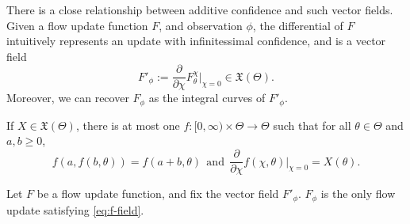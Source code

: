 There is a close relationship between additive confidence and such vector fields.
Given a flow update function $F$, and observation $\phi$, the
differential of $F$
intuitively represents an update with infinitessimal confidence, 
and is a vector field
\begin{equation}
	F'_\phi 
	:= \frac{\partial}{\partial \chi} F_{\theta}^{\chi} \Big|_{\chi=0}
	\in  \mathfrak X(\Theta).
	\label{eq:f-field}
\end{equation}
Moreover, we can recover $F_\phi$ as the integral curves of $F'_\phi$.

\begin{fact}
	If $X \in \mathfrak X(\Theta)$, 
	there is at most one
	$f : [0,\infty) \times \Theta \to \Theta$
	such that for all $\theta \in \Theta$ and $a,b\ge 0$,
	\[
	f(a, f(b, \theta)) = f(a+b,\theta)
		~~\text{and}~~
	\frac{\partial}{\partial \chi}
	 	f(\chi,\theta)
		\Big|_{\chi{=}0}
		\!\!= X(\theta)
		.
	\]
	\label{fact:unique-integral-curves}
\end{fact}
\begin{coro}
	Let $F$ be a flow update function, and fix the vector field $F'_{\phi}$.
	$F_\phi$ is the only flow update satisfying \eqref{eq:f-field}.
	\label{fact:unique-flow-for-vfield}
\end{coro}

